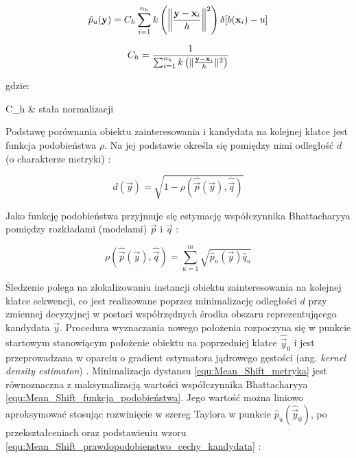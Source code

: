 \begin{equation}
\label{equ:Mean_Shift_prawdopodobienstwo_cechy_kandydata}
	\hat{p}_u(\vec{y}) = C_h \sum_{i=1}^{n_h} k \left(\norm[\bigg]{\frac{\vec{y} - \vec{x}_i}{h}}^2\right) \delta [ b(\vec{x}_i) - u]
\end{equation}

\begin{equation}
\label{equ:Mean_Shift_prawdopodobienstwo_cechy_kandydata_stala_normalizacji}
	C_h = \frac{1}{\sum_{i=1}^{n_h} k \left(\norm{\frac{\vec{y} - \vec{x}_i}{h}}^2 \right) }
\end{equation}

\noindent
gdzie:

\begin{conditions}
	C_h & stała normalizacji \\
\end{conditions}

Podstawę porównania obiektu zainteresowania i kandydata na kolejnej klatce jest funkcja podobieństwa $\rho$. Na jej podstawie określa się pomiędzy nimi odległość $d$ (o charakterze metryki) \cite{Comaniciu2003}:

\begin{equation}
\label{equ:Mean_Shift_metryka}
	d(\vec{y}) =  \sqrt{1 - \rho(\hat{\vec{p}}(\vec{y}), \hat{\vec{q}})}
\end{equation}

Jako funkcję podobieństwa przyjmuje się estymację współczynnika Bhattacharyya pomiędzy rozkładami (modelami) $\vec{p}$ i $\vec{q}$ \cite{Comaniciu2003}:

\begin{equation}
\label{equ:Mean_Shift_funkcja_podobieństwa}
	\rho(\hat{\vec{p}}(\vec{y}), \hat{\vec{q}}) = \sum_{u=1}^m \sqrt{\hat{p}_u(\vec{y}) \hat{q}_u}
\end{equation}

Śledzenie polega na zlokalizowaniu instancji obiektu zainteresowania na kolejnej klatce sekwencji, co jest realizowane poprzez minimalizację odległości $d$ przy zmiennej decyzyjnej w postaci współrzędnych środka obszaru reprezentującego kandydata $\vec{y}$. Procedura wyznaczania nowego położenia rozpoczyna się w punkcie startowym stanowiącym położenie obiektu na poprzedniej klatce $\hat{\vec{y}}_0$ i jest przeprowadzana w oparciu o gradient estymatora jądrowego gęstości (ang. \textit{kernel density estimaton}) \cite{Comaniciu2003}. Minimalizacja dystansu \ref{equ:Mean_Shift_metryka} jest równoznaczna z maksymalizacją wartości współczynnika Bhattacharyya \ref{equ:Mean_Shift_funkcja_podobieństwa}. Jego wartość można liniowo aproksymować stosując rozwinięcie w szereg Taylora w punkcie $\hat{p}_u(\hat{\vec{y}}_0)$, po przekształceniach oraz podstawieniu wzoru \ref{equ:Mean_Shift_prawdopodobienstwo_cechy_kandydata} \cite{Comaniciu2003}:

